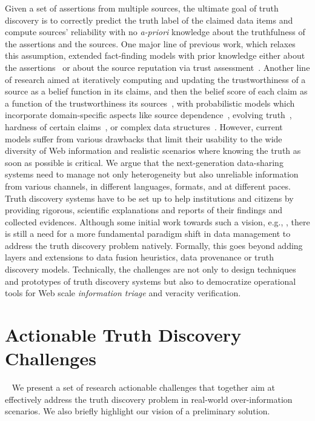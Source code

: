 \documentclass[prodmode,acmtecs]{acmsmall} %
\begin{document}
Given a set of assertions from multiple sources, the ultimate goal of truth discovery is to correctly predict the truth label of the claimed
data items and compute sources' reliability with no \emph{a-priori} knowledge about the truthfulness of the assertions and the sources. One 
major line of previous work, which relaxes this assumption, extended fact-finding models with prior knowledge either about the assertions~\cite{PasternackR13} 
or about the source reputation via trust assessment~\cite{BalakrishnanK11}. Another line of research aimed at iteratively computing and updating the trustworthiness
of a source as a belief function in its claims, and then the belief score of each claim as a function of the trustworthiness its sources~\cite{YinHY08}, with 
probabilistic models which incorporate domain-specific aspects like source dependence~\cite{DongBHS10a}, evolving truth~\cite{DongBS09a}, hardness of certain 
claims~\cite{GallandAMS10}, or complex data structures~\cite{ZhaoRGH12,GoasdoueKKLMZ13}. However, current models suffer from various drawbacks that 
limit their usability to the wide diversity of Web information and realistic scenarios where knowing the truth as soon as possible 
is critical. 
 We argue that the next-generation data-sharing systems need to manage not only heterogeneity but also unreliable 
 information from various channels, in different languages, formats, and at different paces. Truth discovery systems 
 have to be set up to help institutions and citizens by providing rigorous, scientific explanations and reports 
 of their findings and collected evidences. Although some initial work towards such a vision,
 e.g., \cite{DongS2013,DongBHS10a,LiDLMS12}, there is still a need for a more fundamental paradigm shift in data
 management to address the truth discovery problem natively. Formally, this goes beyond adding layers and extensions to
 data fusion heuristics, data provenance or truth discovery models. Technically, the challenges are not only to  design 
 techniques and prototypes of truth discovery systems but also to democratize operational tools for Web scale \emph{information
 triage} and veracity verification.
  
  
  

 
\section{Actionable Truth Discovery Challenges}~\label{sect:challenges-solutions}
We present a set of research actionable challenges that together aim at effectively address 
the truth discovery problem in real-world over-information scenarios. We also briefly highlight
our vision of a preliminary solution.
\end{document}
